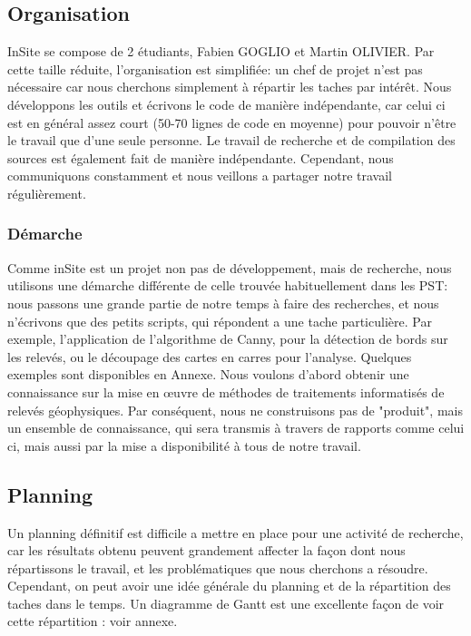 \documentclass[a4paper, 12pt, titlepage, oneside, french]{article}
\begin{document}
	\subsection{Organisation}
	InSite se compose de 2 étudiants, Fabien GOGLIO et Martin OLIVIER. Par cette taille réduite, l'organisation est simplifiée: un chef de projet n'est pas nécessaire car nous cherchons simplement à répartir les taches par intérêt. Nous développons les outils et écrivons le code de manière indépendante, car celui ci est en général assez court (50-70 lignes de code en moyenne) pour pouvoir n'être le travail que d'une seule personne. Le travail de recherche et de compilation des sources est également fait de manière indépendante. Cependant, nous communiquons constamment et nous veillons a partager notre travail régulièrement.   
	\subsubsection{Démarche}
	Comme inSite est un projet non pas de développement, mais de recherche, nous utilisons une démarche différente de celle trouvée habituellement dans les PST: nous passons une grande partie de notre temps à faire des recherches, et nous n'écrivons que des petits scripts, qui répondent a une tache particulière. Par exemple, l'application de l'algorithme de Canny, pour la détection de bords sur les relevés, ou le découpage des cartes en carres pour l'analyse. Quelques exemples sont disponibles en Annexe. Nous voulons d'abord obtenir une connaissance sur la mise en œuvre de méthodes de traitements informatisés de relevés géophysiques. Par conséquent, nous ne construisons pas de "produit", mais un ensemble de connaissance, qui sera transmis à travers de rapports comme celui ci, mais aussi par la mise a disponibilité à tous de notre travail.
	\subsection{Planning}
	Un planning définitif est difficile a mettre en place pour une activité de recherche, car les résultats obtenu peuvent grandement affecter la façon dont nous répartissons le travail, et les problématiques que nous cherchons a résoudre. Cependant, on peut avoir une idée générale du planning et de la répartition des taches dans le temps. Un diagramme de Gantt est une excellente façon de voir cette répartition : voir annexe.
\newpage
\end{document}
